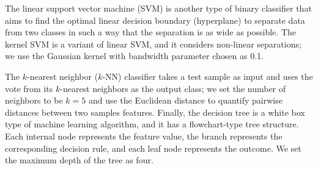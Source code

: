 \documentclass[journal]{IEEEtran}
\begin{document}
The linear support vector machine (SVM) is another type of binary classifier that aims to find the optimal linear decision boundary (hyperplane) to separate data from two classes in such a way that the separation is as wide as possible. The kernel SVM is a variant of linear SVM, and it considers non-linear separations; we use the Gaussian kernel with bandwidth parameter chosen as 0.1. 

The $k$-nearest neighbor ($k$-NN) classifier takes a test sample as input and uses the vote from its $k$-nearest neighbors as the output class; we set the number of neighbors to be $k=5$ and use the Euclidean distance to quantify pairwise distances between two samples features. 
Finally, the decision tree is a white box type of machine learning algorithm, and it has a flowchart-type tree structure. Each internal node represents the feature value, the branch represents the corresponding decision rule, and each leaf node represents the outcome. We set the maximum depth of the tree as four.



\end{document}

